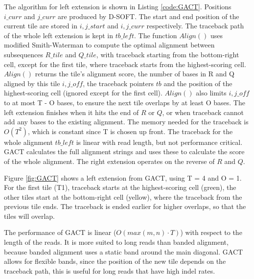 \documentclass[../thesis.tex]{subfiles}
\begin{document}
The algorithm for left extension is shown in Listing \ref{code:GACT}.
Positions $i\_curr$ and $j\_curr$ are produced by D-SOFT.
The start and end position of the current tile are stored in $i,j\_start$ and $i,j\_curr$ respectively.
The traceback path of the whole left extension is kept in $tb\_left$.
The function $Align()$ uses modified Smith-Waterman to compute the optimal alignment between subsequences $R\_tile$ and $Q\_tile$, with traceback starting from the bottom-right cell, except for the first tile, where traceback starts from the highest-scoring cell.
$Align()$ returns the tile's alignment score, the number of bases in R and Q aligned by this tile $i,j\_off$, the traceback pointers $tb$ and the position of the highest-scoring cell (ignored except for the first cell).
$Align()$ also limits $i,j\_off$ to at most T - O bases, to ensure the next tile overlaps by at least O bases.
The left extension finishes when it hits the end of $R$ or $Q$, or when traceback cannot add any bases to the existing alignment.
The memory needed for the traceback is $O(T^2)$, which is constant since T is chosen up front.
The traceback for the whole alignment $tb\_left$ is linear with read length, but not performance critical.
GACT calculates the full alignment strings and uses these to calculate the score of the whole alignment.
The right extension operates on the reverse of $R$ and $Q$.



Figure \ref{fig:GACT} shows a left extension from GACT, using T = 4 and O = 1.
For the first tile (T1), traceback starts at the highest-scoring cell (green), the other tiles start at the bottom-right cell (yellow), where the traceback from the previous tile ends.
The traceback is ended earlier for higher overlaps, so that the tiles will overlap.




The performance of GACT is linear ($O(max(m,n)\cdot T)$) with respect to the length of the reads.
It is more suited to long reads than banded alignment, because banded alignment uses a static band around the main diagonal.
GACT allows for flexible bands, since the position of the new tile depends on the traceback path, this is useful for long reads that have high indel rates.
\end{document}
